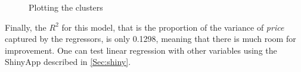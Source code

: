 \begin{figure}[H]
\centering
{}
\caption{Plotting the clusters}
\label{figure:regrplots}
\centering
\end{figure}

Finally, the $R^2$ for this model, that is the proportion of the variance of \textit{price} captured by the regressors, is only 0.1298, meaning that there is much room for improvement. One can test linear regression with other variables using the ShinyApp described in \ref{Sec:shiny}.